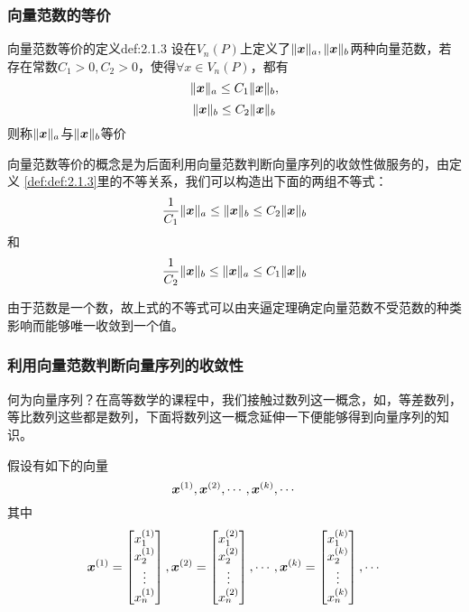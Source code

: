 \documentclass[12pt, a4paper, oneside, UTF8]{ctexbook}
\begin{document}
\subsubsection{向量范数的等价}
\begin{defn}{向量范数等价的定义}{def:2.1.3}
    设在$V_n(P)$上定义了$\Vert\boldsymbol{x}\Vert_a,\Vert\boldsymbol{x}\Vert_b$两种向量范数，若存在常数$C_1>0,C_2>0$，使得$\forall x\in V_n(P)$，都有\[\Vert\boldsymbol{x}\Vert_a\leq C_1\Vert\boldsymbol{x}\Vert_b,\]
    \[\Vert\boldsymbol{x}\Vert_b\leq C_2\Vert\boldsymbol{x}\Vert_b\]
    则称$\Vert\boldsymbol{x}\Vert_a$与$\Vert\boldsymbol{x}\Vert_b$等价
\end{defn}

向量范数等价的概念是为后面利用向量范数判断向量序列的收敛性做服务的，由定义
\ref{def:def:2.1.3}里的不等关系，我们可以构造出下面的两组不等式：
\[\frac{1}{C_1}\Vert\boldsymbol{x}\Vert_a\leq \Vert\boldsymbol{x}\Vert_b\leq C_2\Vert\boldsymbol{x}\Vert_b\]
和\[\frac{1}{C_2}\Vert\boldsymbol{x}\Vert_b\leq \Vert\boldsymbol{x}\Vert_a\leq C_1\Vert\boldsymbol{x}\Vert_b\]

由于范数是一个数，故上式的不等式可以由夹逼定理确定向量范数不受范数的种类影响而能够唯一收敛到一个值。

\subsubsection{利用向量范数判断向量序列的收敛性}

何为向量序列？在高等数学的课程中，我们接触过数列这一概念，如，等差数列，等比数列这些都是数列，下面将数列这一概念延伸一下便能够得到向量序列的知识。

假设有如下的向量\[\boldsymbol{x}^{(1)},\boldsymbol{x}^{(2)},\cdots,\boldsymbol{x}^{(k)},\cdots\]
其中
\[\boldsymbol{x}^{(1)}=\begin{bmatrix}
    x_1^{(1)}\\
    x_2^{(1)}\\
    \vdots\\
    x_n^{(1)}\\
\end{bmatrix},
\boldsymbol{x}^{(2)}=\begin{bmatrix}
    x_1^{(2)}\\
    x_2^{(2)}\\
    \vdots\\
    x_n^{(2)}\\
\end{bmatrix},\cdots,
\boldsymbol{x}^{(k)}=\begin{bmatrix}
    x_1^{(k)}\\
    x_2^{(k)}\\
    \vdots\\
    x_n^{(k)}\\
\end{bmatrix},\cdots
\]
\end{document}
